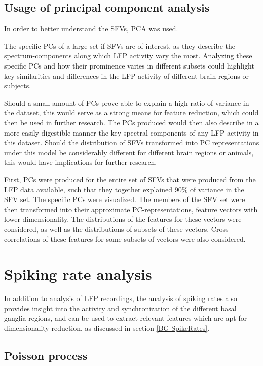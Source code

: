 \documentclass{kththesis}
\begin{document}
\subsection{Usage of principal component analysis}\label{PCA Methods}

In order to better understand the SFVs, PCA was used.

The specific PCs of a large set if SFVs are of interest, as they describe the spectrum-components along which LFP activity vary the most.
Analyzing these specific PCs and how their prominence varies in different subsets could highlight key similarities and differences in the LFP activity of different brain regions or subjects.

Should a small amount of PCs prove able to explain a high ratio of variance in the dataset, this would serve as a strong means for feature reduction, which could then be used in further research.
The PCs produced would then also describe in a more easily digestible manner the key spectral components of any LFP activity in this dataset.
Should the distribution of SFVs transformed into PC representations under this model be considerably different for different brain regions or animals, this would have implications for further research.

First, PCs were produced for the entire set of SFVs that were produced from the LFP data available, such that they together explained 90\% of variance in the SFV set.
The specific PCs were visualized.
The members of the SFV set were then transformed into their approximate PC-representations, feature vectors with lower dimensionality.
The distributions of the features for these vectors were considered, as well as the distributions of subsets of these vectors.
Cross-correlations of these features for some subsets of vectors were also considered.

\section{Spiking rate analysis}

In addition to analysis of LFP recordings, the analysis of spiking rates also provides insight into the activity and synchronization of the different basal ganglia regions, and can be used to extract relevant features which are apt for dimensionality reduction, as discussed in section \ref{BG SpikeRates}.

\subsection{Poisson process}\label{Poiss Method}
\end{document}
